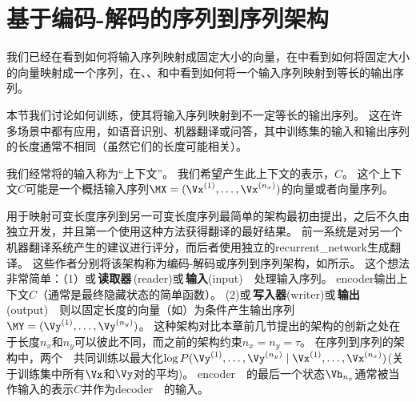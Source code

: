 
\section{基于编码-解码的序列到序列架构}
\label{sec:encoder_decoder_sequence_to_sequence_architectures}
我们已经在看到如何将输入序列映射成固定大小的向量，在中看到如何将固定大小的向量映射成一个序列，在、、和中看到如何将一个输入序列映射到等长的输出序列。

本节我们讨论如何训练，使其将输入序列映射到不一定等长的输出序列。
这在许多场景中都有应用，如语音识别、机器翻译或问答，其中训练集的输入和输出序列的长度通常不相同（虽然它们的长度可能相关）。

我们经常将的输入称为``上下文''。
我们希望产生此上下文的表示，$C$。
这个上下文$C$可能是一个概括输入序列$\MX=(\Vx^{(1)},\dots,\Vx^{(n_x)})$的向量或者向量序列。

用于映射可变长度序列到另一可变长度序列最简单的架构最初由\cite{Cho-et-al-2014a}提出，之后不久由\cite{Sutskever-et-al-2014}独立开发，并且第一个使用这种方法获得翻译的最好结果。
前一系统是对另一个机器翻译系统产生的建议进行评分，而后者使用独立的\gls{recurrent_network}生成翻译。
这些作者分别将该架构称为编码-解码或序列到序列架构，如所示。
这个想法非常简单：（1）或\,\textbf{读取器}\,(reader)或\,\textbf{输入}(input)~~处理输入序列。
\gls{encoder}输出上下文$C$（通常是最终隐藏状态的简单函数）。
(2)或\,\textbf{写入器}(writer)或\,\textbf{输出}(output)~~则以固定长度的向量（如）为条件产生输出序列$\MY=(\Vy^{(1)}, \dots, \Vy^{(n_y)})$。
这种架构对比本章前几节提出的架构的创新之处在于长度$n_x$和$n_y$可以彼此不同，而之前的架构约束$n_x = n_y = \tau$。
在序列到序列的架构中，两个~~共同训练以最大化$\log P( \Vy^{(1)}, \dots, \Vy^{(n_y)} \mid \Vx^{(1)},\dots,\Vx^{(n_x)} )$(关于训练集中所有$\Vx$和$\Vy$对的平均)。
\gls{encoder}~~的最后一个状态$\Vh_{n_x}$通常被当作输入的表示$C$并作为\gls{decoder}~~的输入。

